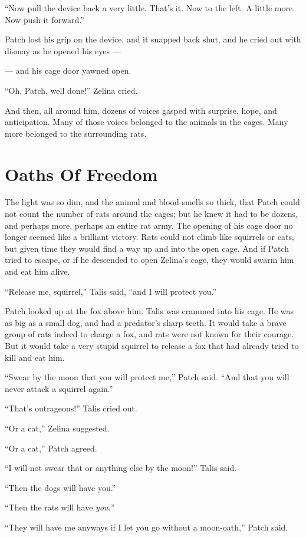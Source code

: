 \documentclass[12pt]{memoir}
\begin{document}
“Now pull the device back a very little. That’s it. Now to the left. A
little more. Now push it forward.”

Patch lost his grip on the device, and it snapped back shut, and he
cried out with dismay as he opened his eyes —

— and his cage door yawned open.

“Oh, Patch, well done!” Zelina cried.

And then, all around him, dozens of voices gasped with surprise, hope,
and anticipation. Many of those voices belonged to the animals in the
cages. Many more belonged to the surrounding rats.


\section{Oaths Of Freedom}

The light was so dim, and the animal and blood-smells so thick, that
Patch could not count the number of rats around the cages; but he knew
it had to be dozens, and perhaps more, perhaps an entire rat army. The
opening of his cage door no longer seemed like a brilliant
victory. Rats could not climb like squirrels or cats, but given time
they would find a way up and into the open cage. And if Patch tried to
escape, or if he descended to open Zelina’s cage, they would swarm him
and eat him alive.

“Release me, squirrel,” Talis said, “and I will protect you.”

Patch looked up at the fox above him. Talis was crammed into his
cage. He was as big as a small dog, and had a predator’s sharp
teeth. It would take a brave group of rats indeed to charge a fox, and
rats were not known for their courage. But it would take a very stupid
squirrel to release a fox that had already tried to kill and eat him.

“Swear by the moon that you will protect me,” Patch said. “And that
you will never attack a squirrel again.”

“That’s outrageous!” Talis cried out.

“Or a cat,” Zelina suggested.

“Or a cat,” Patch agreed.

“I will not swear that or anything else by the moon!” Talis said.

“Then the dogs will have you.”

“Then the rats will have \textit{you.}”

“They will have me anyways if I let you go without a moon-oath,” Patch
said.
\end{document}
